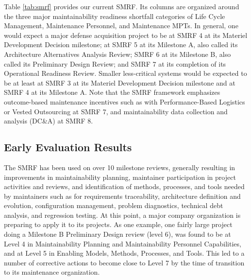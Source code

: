 Table \ref{tab:smrf} provides our current SMRF. Its columns are organized around the three major maintainability readiness shortfall categories of Life Cycle Management, Maintenance Personnel, and Maintenance MPTs. In general, one would expect a major defense acquisition project to be at SMRF 4 at its Materiel Development Decision milestone; at SMRF 5 at its Milestone A, also called its Architecture Alternatives Analysis Review; SMRF 6 at its Milestone B, also called its Preliminary Design Review; and SMRF 7 at its completion of its Operational Readiness Review. Smaller less-critical systems would be expected to be at least at SMRF 3 at its Materiel Development Decision milestone and at SMRF 4 at its Milestone A. Note that the SMRF framework emphasizes outcome-based maintenance incentives such as with Performance-Based Logistics or Vested Outsourcing \cite{vitasek2013vested} at SMRF 7, and maintainability data collection and analysis (DC\&A) at SMRF 8.



\subsection{Early Evaluation Results}
The SMRF has been used on over 10 milestone reviews, generally resulting in improvements in maintainability planning, maintainer participation in project activities and reviews, and identification  of methods, processes, and tools needed by maintainers such as  for requirements traceability, architecture definition and evolution, configuration management, problem diagnostics, technical debt analysis, and regression testing. At this point, a major company organization is preparing to apply it to its projects.
As one example, one fairly large project doing a Milestone B Preliminary Design review (level 6), was found to be at Level 4 in Maintainability Planning and Maintainability Personnel Capabilities, and at Level 5 in Enabling Models, Methods, Processes, and Tools. This led to a number of corrective actions to become close to Level 7 by the time of transition to its maintenance organization.

